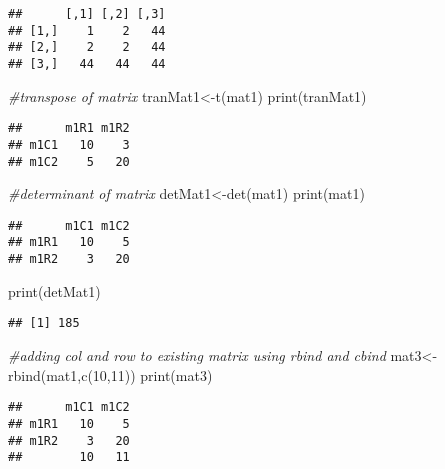 \documentclass[
]{article}
\newenvironment{Shaded}{\begin{snugshade}}{\end{snugshade}}
\newcommand{\CommentTok}[1]{\textcolor[rgb]{0.56,0.35,0.01}{\textit{#1}}}
\newcommand{\DecValTok}[1]{\textcolor[rgb]{0.00,0.00,0.81}{#1}}
\newcommand{\FunctionTok}[1]{\textcolor[rgb]{0.00,0.00,0.00}{#1}}
\newcommand{\NormalTok}[1]{#1}
\newcommand{\OtherTok}[1]{\textcolor[rgb]{0.56,0.35,0.01}{#1}}
\begin{document}
\begin{verbatim}
##      [,1] [,2] [,3]
## [1,]    1    2   44
## [2,]    2    2   44
## [3,]   44   44   44
\end{verbatim}

\begin{Shaded}
\begin{Highlighting}[]
\CommentTok{\#transpose of matrix}
\NormalTok{tranMat1}\OtherTok{\textless{}{-}}\FunctionTok{t}\NormalTok{(mat1)}
\FunctionTok{print}\NormalTok{(tranMat1)}
\end{Highlighting}
\end{Shaded}

\begin{verbatim}
##      m1R1 m1R2
## m1C1   10    3
## m1C2    5   20
\end{verbatim}

\begin{Shaded}
\begin{Highlighting}[]
\CommentTok{\#determinant of  matrix}
\NormalTok{detMat1}\OtherTok{\textless{}{-}}\FunctionTok{det}\NormalTok{(mat1)}
\FunctionTok{print}\NormalTok{(mat1)}
\end{Highlighting}
\end{Shaded}

\begin{verbatim}
##      m1C1 m1C2
## m1R1   10    5
## m1R2    3   20
\end{verbatim}

\begin{Shaded}
\begin{Highlighting}[]
\FunctionTok{print}\NormalTok{(detMat1)}
\end{Highlighting}
\end{Shaded}

\begin{verbatim}
## [1] 185
\end{verbatim}

\begin{Shaded}
\begin{Highlighting}[]
\CommentTok{\#adding col and row to existing matrix using rbind and cbind}
\NormalTok{mat3}\OtherTok{\textless{}{-}}\FunctionTok{rbind}\NormalTok{(mat1,}\FunctionTok{c}\NormalTok{(}\DecValTok{10}\NormalTok{,}\DecValTok{11}\NormalTok{))}
\FunctionTok{print}\NormalTok{(mat3)}
\end{Highlighting}
\end{Shaded}

\begin{verbatim}
##      m1C1 m1C2
## m1R1   10    5
## m1R2    3   20
##        10   11
\end{verbatim}
\end{document}
